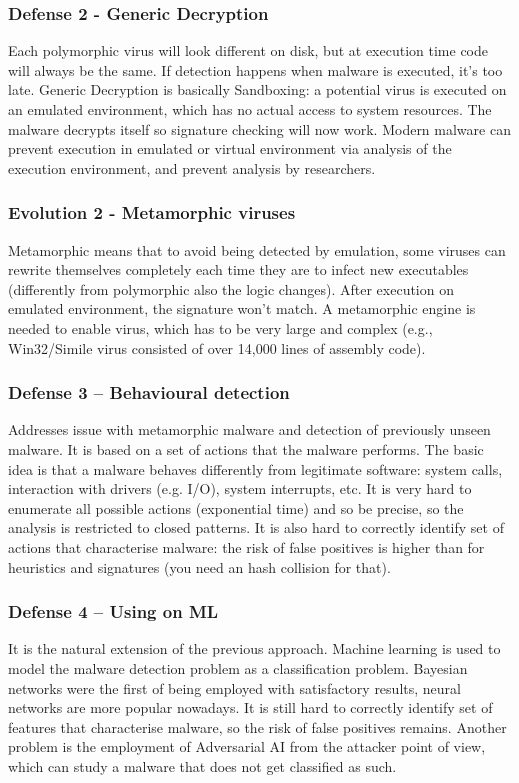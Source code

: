 \documentclass[a4paper, 10pt, titlepage]{article}
\begin{document}
\subsubsection*{Defense 2 - Generic Decryption}
Each polymorphic virus will look different on disk, but at execution time code will always be the same. If detection happens when malware is executed, it’s too late. Generic Decryption is basically Sandboxing: a potential virus is executed on an emulated environment, which has no actual access to system resources. The malware decrypts itself so signature checking will now work. Modern malware can prevent execution in emulated or virtual environment via analysis of the execution environment, and prevent analysis by researchers.

\subsubsection*{Evolution 2 - Metamorphic viruses}
Metamorphic means that to avoid being detected by emulation, some viruses can rewrite themselves completely each time they are to infect new executables (differently from polymorphic also the logic changes). After execution on emulated environment, the signature won’t match. A metamorphic engine is needed to enable virus, which has to be very large and complex (e.g., Win32/Simile virus consisted of over 14,000 lines of assembly code).

\subsubsection*{Defense 3 – Behavioural detection}
Addresses issue with metamorphic malware and detection of previously unseen malware. It is based on a set of actions that the malware performs. The basic idea is that a malware behaves differently from legitimate software: system calls, interaction with drivers (e.g. I/O), system interrupts, etc. 
It is very hard to enumerate all possible actions (exponential time) and so be precise, so the analysis is restricted to closed patterns. It is also hard to correctly identify set of actions that characterise malware: the risk of false positives is higher than for heuristics and signatures (you need an hash collision for that).

\subsubsection*{Defense 4 – Using on ML}
It is the natural extension of the previous approach. Machine learning is used to model the malware detection problem as a classification problem. Bayesian networks were the first of being employed with satisfactory results, neural networks are more popular nowadays. It is still hard to correctly identify set of features that characterise malware, so the risk of false positives remains. Another problem is the employment of Adversarial AI from the attacker point of view, which can study a malware that does not get classified as such.
\end{document}
